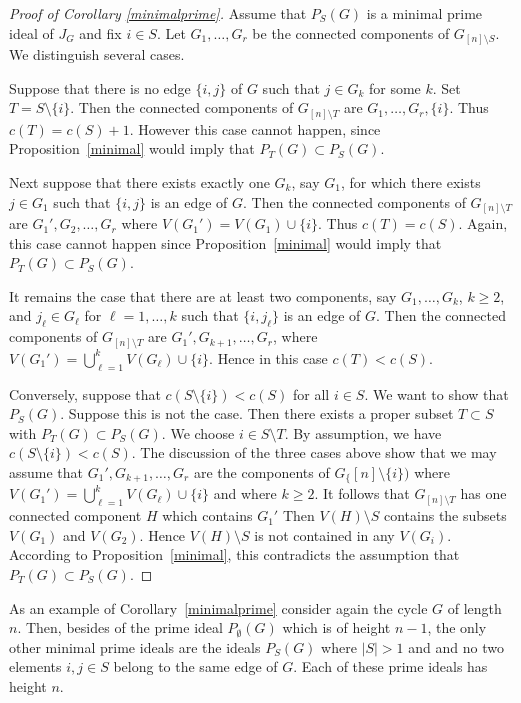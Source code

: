 \documentclass[11pt]{amsart}
\let\union=\cup
\let\Union=\bigcup
\begin{document}
\begin{proof}[Proof of Corollary \ref{minimalprime}]
Assume that $P_S(G)$ is a minimal prime ideal of $J_G$ and fix $i\in S$. Let $G_1,\ldots,G_r$ be the connected components of $G_{[n]\setminus S}$. We distinguish
several cases.

Suppose that there is no edge $\{i,j\}$ of $G$ such that $j\in G_k$ for some $k$. Set $T=S\setminus \{i\}$. Then the connected components of $G_{[n]\setminus T}$ are $G_1,\ldots,G_r,\{i\}$. Thus $c(T)=c(S)+1$. However this case cannot happen, since  Proposition~\ref{minimal} would imply that $P_T(G)\subset P_S(G)$.

Next suppose that there exists exactly one $G_k$, say $G_1$,  for which there exists $j\in G_1$ such that $\{i,j\}$ is an edge of $G$. Then the connected components of $G_{[n]\setminus T}$  are $G_1', G_2,\ldots, G_r$ where $V(G_1')=V(G_1)\union\{i\}$. Thus $c(T)=c(S)$. Again, this case cannot happen since Proposition~\ref{minimal} would imply that $P_T(G)\subset P_S(G)$.


It remains the case that there are at least two components, say $G_1,\ldots,G_k$, $k\geq 2$, and $j_\ell\in G_\ell$ for $\ell=1,\ldots,k$ such that $\{i,j_\ell\}$ is an edge of $G$. Then the connected components of $G_{[n]\setminus T}$ are $G_1',G_{k+1},\ldots, G_r$, where $V(G_1')=\Union_{\ell=1}^kV(G_\ell)\union\{i\}$. Hence in this case $c(T)<c(S)$.


Conversely, suppose that $c(S\setminus\{i\})<c(S)$ for all $i\in S$. We want to show that $P_S(G)$. Suppose this is not the case. Then there exists a proper subset $T\subset S$ with $P_T(G)\subset P_S(G)$.  We choose $i\in S\setminus T$. By assumption, we have $c(S\setminus\{i\})<c(S)$. The discussion of the three cases above show that we may assume that $G_1',G_{k+1},\ldots, G_r$ are the components of $G_\{[n]\setminus\{i\})$ where $V(G_1')=\Union_{\ell=1}^kV(G_\ell)\union\{i\}$ and where $k\geq 2$. It follows that $G_{[n]\setminus T}$ has one connected component $H$ which contains $G_1'$ Then $V(H)\setminus S$ contains the subsets $V(G_1)$ and $V(G_2)$. Hence $V(H)\setminus S$ is not contained in any $V(G_i)$. According to Proposition~\ref{minimal}, this contradicts the assumption that $P_T(G)\subset P_S(G)$.
\end{proof}




As an example of Corollary~\ref{minimalprime} consider again the cycle $G$ of length $n$. Then,  besides of the prime ideal $P_\emptyset(G)$ which is of height $n-1$, the only other minimal prime ideals are the ideals $P_S(G)$ where $|S|>1$ and and no two elements $i,j\in S$ belong to the same edge of $G$. Each of these prime ideals has height $n$.
\end{document}

